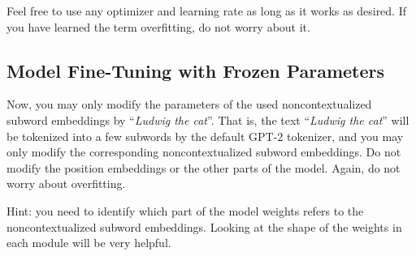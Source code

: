 \documentclass[12pt, letterpaper]{article}
\begin{document}

Feel free to use any optimizer and learning rate as long as it works as desired.
If you have learned the term overfitting, do not worry about it.

\subsection{Model Fine-Tuning with Frozen Parameters}
Now, you may only modify the parameters of the used noncontextualized subword embeddings by ``\textit{Ludwig the cat}''.
That is, the text ``\textit{Ludwig the cat}'' will be tokenized into a few subwords by the default GPT-2 tokenizer, and you may only modify the corresponding noncontextualized subword embeddings.
Do not modify the position embeddings or the other parts of the model.
Again, do not worry about overfitting.

Hint: you need to identify which part of the model weights refers to the noncontextualized subword embeddings.
Looking at the shape of the weights in each module will be very helpful.

\end{document}

